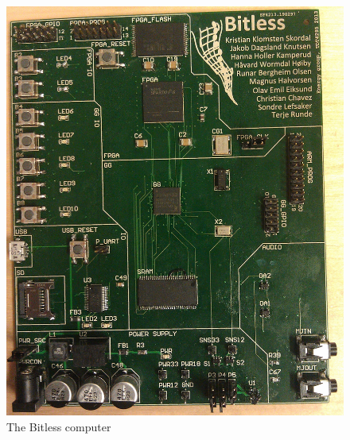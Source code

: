 \begin{figure}[H]
    \centering
    \includegraphics[scale=0.15]{figures/intro/pcb/bitless_overview}
    \caption{The Bitless computer}
    \label{fig:bitless_overview}
\end{figure}
